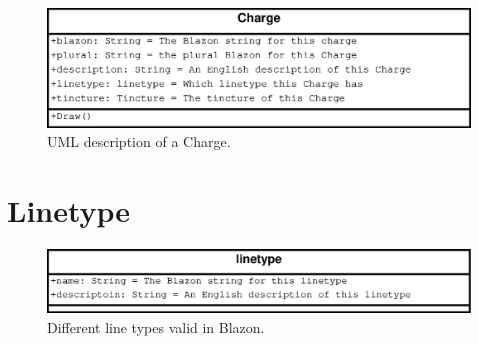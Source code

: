 \begin{figure}[H]
  \centering
    \includegraphics[width=\textwidth]{datastructures/images/charge.eps}
  \caption{UML description of a Charge.\cite{linetypes}}
  \label{fig:lines}
  
\end{figure}

\section{Linetype}



\begin{figure}[H]
  \centering
    \includegraphics[width=\textwidth]{datastructures/images/linetype.eps}
  \caption{Different line types valid in Blazon.\cite{linetypes}}
  \label{fig:lines}
  
\end{figure}


